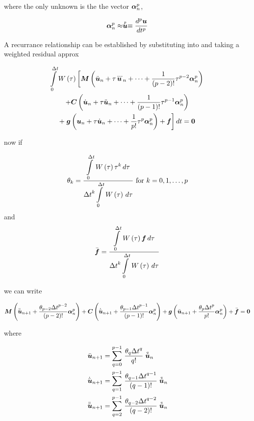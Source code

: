 where the only unknown is the the vector $\vect{\alpha}^{p}_{n}$,

\begin{equation}
  \vect{\alpha}^{p}_{n}\approx\symover{p}{\vect{u}}\equiv\dnby{p}{\vect{u}}{t}
\end{equation}

A recurrance relationship can be established by substituting
 into  and
taking a weighted residual approx

\begin{multline}
  \dintl{0}{\Delta
    t}\fnof{W}{\tau}\left[\matr{M}\pbrac{\ddot{\vect{u}}_{n}+\tau\dddot{\vect{u}}_{n}+\cdots+
    \dfrac{1}{\factorial{p-2}}\tau^{p-2}\vect{\alpha}^{p}_{n}} \right.\\
  +\matr{C}\pbrac{\dot{\vect{u}}_{n}+\tau\ddot{\vect{u}}_{n}+\cdots+
    \dfrac{1}{\factorial{p-1}}\tau^{p-1}\vect{\alpha}^{p}_{n}} \\
  +\left.\fnof{\vect{g}}{\vect{u}_{n}+\tau\dot{\vect{u}}_{n}+\cdots+
    \dfrac{1}{p!}\tau^{p}\vect{\alpha}^{p}_{n}}+\vect{f}\right] dt = \vect{0}
\end{multline}

now if 

\begin{equation}
  \theta_{k}=\dfrac{  \displaystyle\int\limits_{0}^{\Delta t} \, W\left( \tau \right) \tau^{k}\,d\tau }{{\Delta
      t}^{k}  \displaystyle\int\limits_{0}^{\Delta t} \, W\left( \tau \right) \,d\tau } \text{  for  } k=0,1,\ldots,p
\end{equation}
and
\begin{equation}
  \bar{\vect{f}}=\dfrac{\gint{0}{\Delta t}{\fnof{W}{\tau}\vect{f}}{\tau}}{{\Delta
      t}^{k}\gint{0}{\Delta t}{\fnof{W}{\tau}}{\tau}}
\end{equation}

we can write

\begin{equation}
  \matr{M}\pbrac{\ddot{\bar{\vect{u}}}_{n+1}+\dfrac{\theta_{p-2}{\Delta
        t}^{p-2}}{\factorial{p-2}}\vect{\alpha}^{p}_{n}}+
  \matr{C}\pbrac{\dot{\bar{\vect{u}}}_{n+1}+\dfrac{\theta_{p-1}{\Delta
        t}^{p-1}}{\factorial{p-1}}\vect{\alpha}^{p}_{n}}+
  \fnof{\vect{g}}{\bar{\vect{u}}_{n+1}+\dfrac{\theta_{p}{\Delta
        t}^{p}}{p!}\vect{\alpha}^{p}_{n}}+\bar{\vect{f}}=\vect{0}
\end{equation}

where

\begin{equation}
  \begin{split}
    \bar{\vect{u}}_{n+1} &= \gsum{q=0}{p-1}{\dfrac{\theta_{q}{\Delta
            t}^{q}}{q!}\symover{q}{\vect{u}}_{n}} \\
    \dot{\bar{\vect{u}}}_{n+1} &= \gsum{q=1}{p-1}{\dfrac{\theta_{q-1}{\Delta
            t}^{q-1}}{\factorial{q-1}}\symover{q}{\vect{u}}_{n}} \\
    \ddot{\bar{\vect{u}}}_{n+1} &= \gsum{q=2}{p-1}{\dfrac{\theta_{q-2}{\Delta
            t}^{q-2}}{\factorial{q-2}}\symover{q}{\vect{u}}_{n}} 
  \end{split}
\end{equation}

